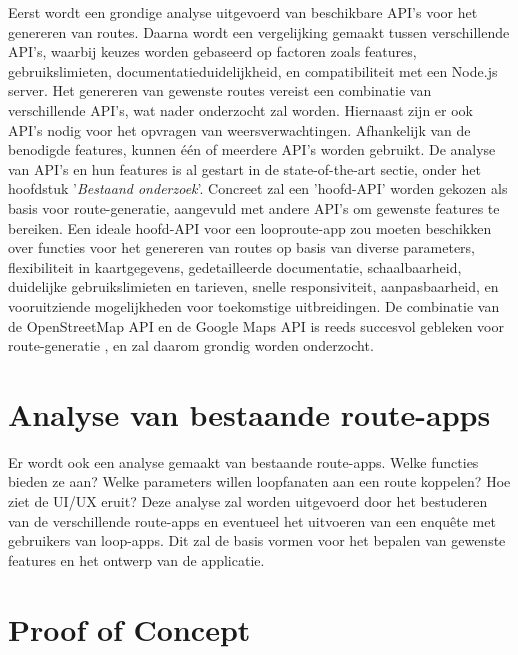 Eerst wordt een grondige analyse uitgevoerd van beschikbare API's voor het genereren van routes.
Daarna wordt een vergelijking gemaakt tussen verschillende API's,
waarbij keuzes worden gebaseerd op factoren zoals features, gebruikslimieten,
documentatieduidelijkheid, en compatibiliteit met een Node.js server.
Het genereren van gewenste routes vereist een combinatie van verschillende API's,
wat nader onderzocht zal worden. Hiernaast zijn er ook API's nodig voor het opvragen van weersverwachtingen.
Afhankelijk van de benodigde features, kunnen één of meerdere API's worden gebruikt.
De analyse van API's en hun features is al gestart in de state-of-the-art sectie,
onder het hoofdstuk '\emph{Bestaand onderzoek}'.
Concreet zal een 'hoofd-API' worden gekozen als basis voor route-generatie,
aangevuld met andere API's om gewenste features te bereiken.
Een ideale hoofd-API voor een looproute-app zou moeten beschikken
over functies voor het genereren van routes op basis van diverse parameters, flexibiliteit in kaartgegevens,
gedetailleerde documentatie, schaalbaarheid, duidelijke gebruikslimieten en tarieven, snelle responsiviteit,
aanpasbaarheid, en vooruitziende mogelijkheden voor toekomstige uitbreidingen.
De combinatie van de OpenStreetMap API en de Google Maps API is reeds succesvol gebleken voor route-generatie \autocite{Loepp2018},
en zal daarom grondig worden onderzocht.

\section{Analyse van bestaande route-apps}

Er wordt ook een analyse gemaakt van bestaande route-apps.
Welke functies bieden ze aan? Welke parameters willen loopfanaten aan een route koppelen? Hoe ziet de UI/UX eruit?
Deze analyse zal worden uitgevoerd door het bestuderen van de verschillende route-apps 
en eventueel het uitvoeren van een enquête met gebruikers van loop-apps.
Dit zal de basis vormen voor het bepalen van gewenste features en het ontwerp van de applicatie. 

\section{Proof of Concept}

